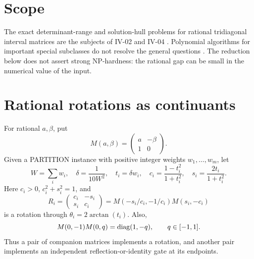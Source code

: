 

\begin{abstract}
A reduction from PARTITION encodes signed sums of small rational rotation angles in the continuant of a tridiagonal interval matrix. It proves NP-completeness of the upper determinant threshold problem, and NP-hardness of exact determinant-range and exact solution-hull computation. The reduction uses independent interval entries, fixed superdiagonal entries equal to 1, and an everywhere nonsingular interval family. For the hull result the right-hand side is the single point $-e_n$. General exact-output upper bounds are also recorded, so each requested polynomial-time existence question is equivalent to $\mathsf P=\mathsf{NP}$.
\end{abstract}
\section{Scope}
The exact determinant-range and solution-hull problems for rational tridiagonal interval matrices are the subjects of IV-02 and IV-04 \cite{repo2,repo4}. Polynomial algorithms for important special subclasses do not resolve the general questions \cite{det,overview,complexity}. The reduction below does not assert strong NP-hardness: the rational gap can be small in the numerical value of the input.
\section{Rational rotations as continuants}
For rational $a,\beta$, put
\[
 M(a,\beta)=\begin{pmatrix}a&-\beta\\1&0\end{pmatrix}.
\]
Given a PARTITION instance with positive integer weights $w_1,\ldots,w_m$, let
\[
 W=\sum_iw_i,\quad\delta=\frac1{10W^2},\quad t_i=\delta w_i,\quad
 c_i=\frac{1-t_i^2}{1+t_i^2},\quad s_i=\frac{2t_i}{1+t_i^2}.
\]
Here $c_i>0$, $c_i^2+s_i^2=1$, and
\[
 R_i=\begin{pmatrix}c_i&-s_i\\s_i&c_i\end{pmatrix}
 =M(-s_i/c_i,-1/c_i)M(s_i,-c_i)
\]
is a rotation through $\theta_i=2\arctan(t_i)$. Also,
\[
 M(0,-1)M(0,q)=\operatorname{diag}(1,-q),\qquad q\in[-1,1].
\]
Thus a pair of companion matrices implements a rotation, and another pair implements an independent reflection-or-identity gate at its endpoints.

